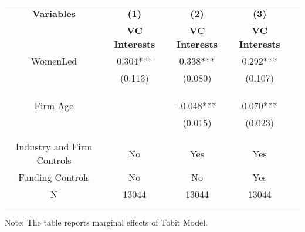  \begin{table}[htbp]
    \begin{tabular}{c c c c c}
    \toprule
    \textbf{Variables} & \textbf{(1)} & \textbf{(2)} & \textbf{(3)}         \\ 
    \textbf & \textbf{VC Interests} & \textbf{VC Interests} & \textbf{VC Interests}   \\ 

    \midrule
    WomenLed         &    0.304*** &      0.338***  &        0.292***   \\
                        &    (0.113)  &      (0.080)   &         (0.107)  \\
                        &             &                &                  \\

                        &             &                &             \\
                        &             &                &                    \\
    Firm Age            &             &      -0.048*** &    0.070***        \\
                        &             &      (0.015)   &    (0.023)       \\
                        &             &                &                 \\
                        &             &                &                \\

Industry and Firm Controls   &   No        &   Yes       &          Yes    \\
    Funding Controls    &   No             &   No        &        Yes        \\

    \midrule
     N                  &   13044          &      13044  &     13044      \\          
    \bottomrule
  
    \addlinespace[1ex]
    \multicolumn{3}{l}{\textsuperscript{***}$P<0.01$, 
      \textsuperscript{**}$P<0.05$, 
      \textsuperscript{*}$P<0.1$}

\end{tabular}
\newline
Note: The table reports marginal effects of Tobit Model.

\end{table}
